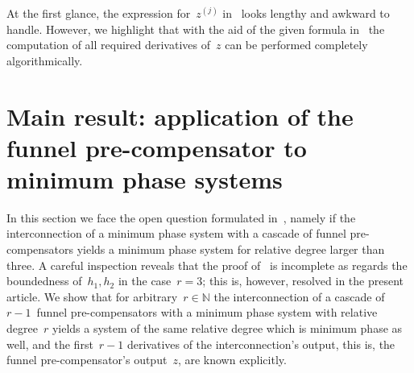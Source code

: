 \documentclass[ envcountsect, envcountsame]{svjour3}
\newcommand{\N}{\mathbb{N}}
\begin{document}
%
At the first glance, the expression for~$z^{(j)}$ in~\cite[Rem.~3]{BergReis18b} looks lengthy and awkward to handle. 
However, we highlight that with the aid of the given formula in~\cite[Rem.~3]{BergReis18b} the computation of all required derivatives of~$z$ can be performed completely algorithmically.


\section{Main result: application of the funnel pre-compensator to minimum phase systems} \label{Sec:main-result-FPC-min-phase}
In this section we face the open question formulated in~\cite[Rem. 4]{BergReis18b}, namely if the interconnection of a minimum phase system with a cascade of funnel pre-compensators yields a minimum phase system for relative degree larger than three.
A careful inspection reveals that the proof of~\cite[Thm. 2]{BergReis18b} is incomplete as regards the boundedness of~$h_1, h_2$ in the case~$r=3$; this is, however, resolved in the present article.
We show that for arbitrary~$r \in \N$ the interconnection of a cascade of $r-1$~funnel pre-compensators with a minimum phase system with relative degree~$r$ yields a system of the same relative degree which is minimum phase as well, and the first~$r-1$ derivatives of the interconnection's output, this is, the funnel pre-compensator's output~$z$, are known explicitly.
%


\ \\
\end{document}
